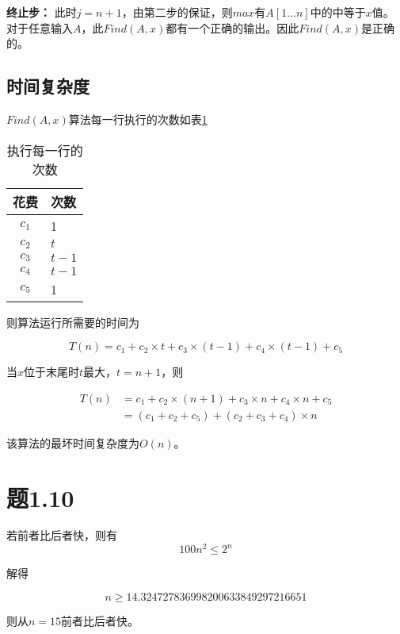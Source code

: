 \documentclass[a4paper,twoside]{article}
\begin{document}
\begin{spacing}{1.2}
\textbf{终止步：} 此时$j=n+1$，由第二步的保证，则$max$有$A[1 \dots n]$中的中等于$x$值。
对于任意输入$A$，此$Find(A,x)$都有一个正确的输出。因此$Find(A,x)$是正确的。

\subsection{时间复杂度}
$Find(A,x)$算法每一行执行的次数如表\ref{tbl:p19}
\begin{table}[h]
	\renewcommand{\arraystretch}{1.2}
	\caption{执行每一行的次数}
	\label{tbl:p19}
	\begin{center}
		{\footnotesize
			\begin{tabular}{c l}
				\toprule
				{花费} & {次数} \\
				\midrule
				$c_1$ & 1 \\
				\hline
				$c_2$ & $t$ \\
				\hline
				$c_3$ & $t-1$ \\
				\hline
				$c_4$ & $t-1$ \\
				\hline
				$c_5$ & 1 \\
				\bottomrule
		\end{tabular}}
	\end{center}
\end{table}


则算法运行所需要的时间为

\begin{equation}
	T(n)=c_1 + c_2 \times t + c_3 \times (t-1) + c_4 \times (t-1) + c_5 \label{eqn:tn19}
\end{equation}

当$x$位于末尾时$t$最大，$t=n+1$，则

\begin{align*}
	T(n)&=c_1 + c_2 \times (n+1) + c_3 \times n + c_4 \times n  + c_5 \\
	&= (c_1+c_2+c_5)+(c_2+c_3+c_4) \times n
\end{align*}

该算法的最坏时间复杂度为$O(n)$。

\section{题1.10}

若前者比后者快，则有
$$
100n^2 \le 2^n
$$

解得

$$
n \ge 14.324727836998200633849297216651
$$

则从$n=15$前者比后者快。


\end{spacing}
\end{document}
